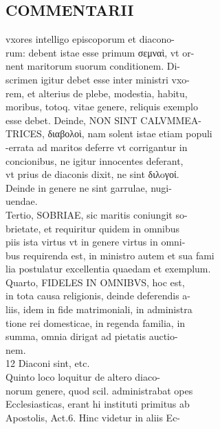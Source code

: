 \documentclass{article}
\begin{document}
\begin{pages}
\section*{COMMENTARII \\
                }vxores intelligo episcoporum et diacono- \\
                rum: debent istae esse primum σεμναὶ, vt or- \\
                nent maritorum suorum conditionem. Di- \\
                scrimen igitur debet esse inter ministri vxo- \\
                rem, et alterius de plebe, modestia, habitu, \\
                moribus, totoq. vitae genere, reliquis exemplo \\
                esse debet. Deinde, NON SINT CALVMMEA- \\
                TRICES, διαβολοὶ, nam solent istae etiam populi \\
                -errata ad maritos deferre vt corrigantur in \\
                concionibus, ne igitur innocentes deferant, \\
                vt prius de diaconis dixit, ne sint διλoγοί. \\
                Deinde in genere ne sint garrulae, nugi- \\
                uendae. \\
                Tertio, SOBRIAE, sic maritis coniungit so- \\
                brietate, et requiritur quidem in omnibus \\
                piis ista virtus vt in genere virtus in omni- \\
                bus requirenda est, in ministro autem et sua fami \\
                lia postulatur excellentia quaedam et exemplum. \\
                Quarto, FIDELES IN OMNIBVS, hoc est, \\
                in tota causa religionis, deinde deferendis a- \\
                liis, idem in fide matrimoniali, in administra \\
                tione rei domesticae, in regenda familia, in \\
                summa, omnia dirigat ad pietatis auctio- \\
                nem. \\
                12 Diaconi sint, etc. \\
                Quinto loco loquitur de altero diaco- \\
                norum genere, quod scil. administrabat opes \\
                Ecclesiasticas, erant hi instituti primitus ab \\
                Apostolis, Act.6. Hinc videtur in aliis Ec- \\
                

\end{pages}
\end{document}
